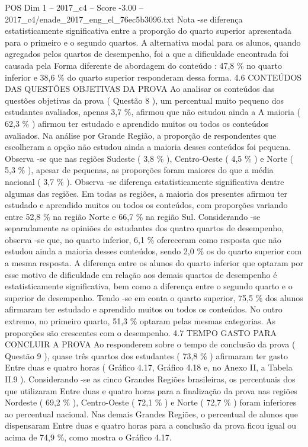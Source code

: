 \begin{textsample}{POS Dim 1 – 2017\_c4 – Score -3.00 – 2017\_c4/enade\_2017\_eng\_el\_76ec5b3096.txt}
Nota -se diferença estatisticamente significativa entre a proporção do quarto superior apresentada para o primeiro e o segundo quartos.
A alternativa modal para os alunos, quando agregados pelos quartos de desempenho, foi a que a dificuldade encontrada foi causada pela Forma diferente de abordagem do conteúdo : 47,8 \% no quarto inferior e 38,6 \% do quarto superior responderam dessa forma. 4.6 CONTEÚDOS DAS QUESTÕES OBJETIVAS DA PROVA Ao analisar os conteúdos das questões objetivas da prova ( Questão 8 ), um percentual muito pequeno dos estudantes avaliados, apenas 3,7 \%, afirmou que não estudou ainda a A maioria ( 62,3 \% ) afirmou ter estudado e aprendido muitos ou todos os conteúdos avaliados.
Na análise por Grande Região, a proporção de respondentes que escolheram a opção não estudou ainda a maioria desses conteúdos foi pequena.
Observa -se que nas regiões Sudeste ( 3,8 \% ), Centro-Oeste ( 4,5 \% ) e Norte ( 5,3 \% ), apesar de pequenas, as proporções foram maiores do que a média nacional ( 3,7 \% ).
Observa -se diferença estatisticamente significativa dentre algumas das regiões.
Em todas as regiões, a maioria dos presentes afirmou ter estudado e aprendido muitos ou todos os conteúdos, com proporções variando entre 52,8 \% na região Norte e 66,7 \% na região Sul.
Considerando -se separadamente as opiniões de estudantes dos quatro quartos de desempenho, observa -se que, no quarto inferior, 6,1 \% ofereceram como resposta que não estudou ainda a maioria desses conteúdos, sendo 2,0 \% os do quarto superior com a mesma resposta.
A diferença entre os alunos do quarto inferior que optaram por esse motivo de dificuldade em relação aos demais quartos de desempenho é estatisticamente significativa, bem como a diferença entre o segundo quarto e o superior de desempenho.
Tendo -se em conta o quarto superior, 75,5 \% dos alunos afirmaram ter estudado e aprendido muitos ou todos os conteúdos.
No outro extremo, no primeiro quarto, 51,3 \% optaram pelas mesmas categorias.
As proporções são crescentes com o desempenho. 4.7 TEMPO GASTO PARA CONCLUIR A PROVA Ao responderem sobre o tempo de conclusão da prova ( Questão 9 ), quase três quartos dos estudantes ( 73,8 \% ) afirmaram ter gasto Entre duas e quatro horas ( Gráfico 4.17, Gráfico 4.18 e, no Anexo II, a Tabela II.9 ).
Considerando -se as cinco Grandes Regiões brasileiras, os percentuais dos que utilizaram Entre duas e quatro horas para a finalização da prova nas regiões Nordeste ( 69,2 \% ), Centro-Oeste ( 72,1 \% ) e Norte ( 72,7 \% ) foram inferiores ao percentual nacional.
Nas demais Grandes Regiões, o percentual de alunos que dispensaram Entre duas e quatro horas para a conclusão da prova ficou igual ou acima de 74,9 \%, como mostra o Gráfico 4.17.

\end{textsample}
